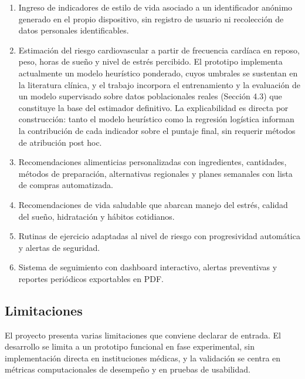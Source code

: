 \documentclass[12pt,letterpaper]{article}
\begin{document}
\begin{enumerate}
  \item Ingreso de indicadores de estilo de vida asociado a un identificador
    anónimo generado en el propio dispositivo, sin registro de usuario ni
    recolección de datos personales identificables.

  \item Estimación del riesgo cardiovascular a partir de frecuencia cardíaca en
    reposo, peso, horas de sueño y nivel de estrés percibido. El prototipo
    implementa actualmente un modelo heurístico ponderado, cuyos umbrales se
    sustentan en la literatura clínica, y el trabajo incorpora el entrenamiento y
    la evaluación de un modelo supervisado sobre datos poblacionales reales
    (Sección 4.3) que constituye la base del estimador definitivo. La
    explicabilidad es directa por construcción: tanto el modelo heurístico como
    la regresión logística informan la contribución de cada indicador sobre el
    puntaje final, sin requerir métodos de atribución post hoc.

  \item Recomendaciones alimenticias personalizadas con ingredientes, cantidades,
    métodos de preparación, alternativas regionales y planes semanales con lista
    de compras automatizada.

  \item Recomendaciones de vida saludable que abarcan manejo del estrés, calidad
    del sueño, hidratación y hábitos cotidianos.

  \item Rutinas de ejercicio adaptadas al nivel de riesgo con progresividad
    automática y alertas de seguridad.

  \item Sistema de seguimiento con dashboard interactivo, alertas preventivas y
    reportes periódicos exportables en PDF.
\end{enumerate}

\subsection{Limitaciones}

El proyecto presenta varias limitaciones que conviene declarar de entrada. El
desarrollo se limita a un prototipo funcional en fase experimental, sin
implementación directa en instituciones médicas, y la validación se centra en
métricas computacionales de desempeño y en pruebas de usabilidad.
\end{document}
